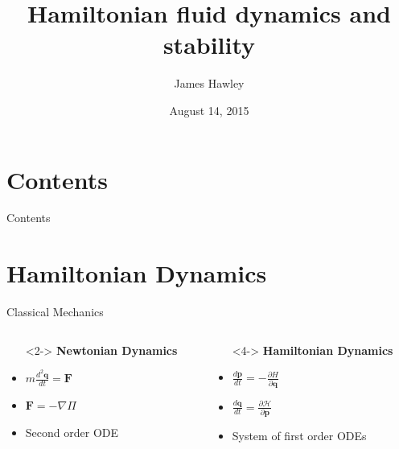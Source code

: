 \documentclass{beamer}
\title{Hamiltonian fluid dynamics and stability}
\author{James Hawley}
\date{August 14, 2015}
\institute{University of Waterloo}
\begin{document}
	\begin{frame}
		\titlepage
	\end{frame}

	\section*{Contents}
		\begin{frame}{Contents}
			\tableofcontents
		\end{frame}

	\section{Hamiltonian Dynamics}
		\begin{frame}[t]{Classical Mechanics}
			\begin{columns}
				\begin{column}{0.5\textwidth}
					\begin{itemize}
						\item[]<2-> \textbf{Newtonian Dynamics}
						\item<3-> $m\frac{d^2 \mathbf{q}}{dt} = \mathbf{F}$
						\item<3-> $\mathbf{F} = -\nabla \Pi$
						\item<3-> Second order ODE
					\end{itemize}
				\end{column}
				\begin{column}{0.5\textwidth}
					\begin{itemize}
						\item[]<4-> \textbf{Hamiltonian Dynamics}
						\item<5-> $\frac{d \mathbf{p}}{dt} = -\frac{\partial H}{\partial \mathbf{q}}$
						\item<5-> $\frac{d \mathbf{q}}{dt} = \frac{\partial \mathcal{H}}{\partial \mathbf{p}}$
						\item<5-> System of first order ODEs
					\end{itemize}
				\end{column}
			\end{columns}
		\end{frame}
\end{document}
